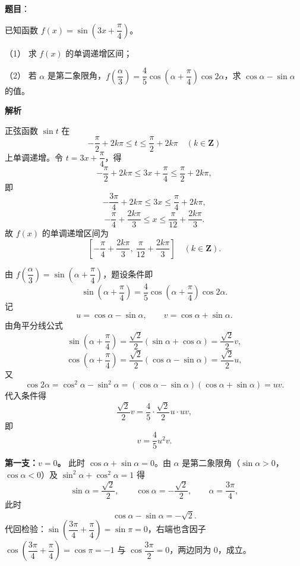 \begin{answer}

\textbf{题目}：

已知函数 $f(x)=\sin\left(3x+\dfrac\pi4\right)$。

（1） 求 $f(x)$ 的单调递增区间；

（2） 若 $\alpha$ 是第二象限角，$f\left(\dfrac\alpha3\right)=\dfrac45\cos\left(\alpha+\dfrac\pi4\right)\cos 2\alpha$，求 $\cos\alpha-\sin\alpha$ 的值。

\textbf{解析}


正弦函数 $\sin t$ 在
\nopagebreak[4]
\[-\frac\pi2+2k\pi\leqslant t\leqslant\frac\pi2+2k\pi\quad(k\in\mathbf Z)\]
上单调递增。令 $t=3x+\dfrac\pi4$，得
\nopagebreak[4]
\[-\frac\pi2+2k\pi\leqslant 3x+\frac\pi4\leqslant\frac\pi2+2k\pi,\]
即
\nopagebreak[4]
\[-\frac{3\pi}4+2k\pi\leqslant 3x\leqslant\frac\pi4+2k\pi,\]
\nopagebreak[4]
\[-\frac\pi4+\frac{2k\pi}3\leqslant x\leqslant\frac\pi{12}+\frac{2k\pi}3 .\]
故 $f(x)$ 的单调递增区间为
\nopagebreak[4]
\[\left[-\frac\pi4+\frac{2k\pi}3,\ \frac\pi{12}+\frac{2k\pi}3\right]\quad(k\in\mathbf Z).\]


由 $f\left(\dfrac\alpha3\right)=\sin\left(\alpha+\dfrac\pi4\right)$，题设条件即
\nopagebreak[4]
\[\sin\left(\alpha+\frac\pi4\right)=\frac45\cos\left(\alpha+\frac\pi4\right)\cos2\alpha .\]
记
\nopagebreak[4]
\[u=\cos\alpha-\sin\alpha,\qquad v=\cos\alpha+\sin\alpha .\]
由角平分线公式
\nopagebreak[4]
\[\sin\left(\alpha+\frac\pi4\right)=\frac{\sqrt2}2(\sin\alpha+\cos\alpha)=\frac{\sqrt2}2v,\]
\nopagebreak[4]
\[\cos\left(\alpha+\frac\pi4\right)=\frac{\sqrt2}2(\cos\alpha-\sin\alpha)=\frac{\sqrt2}2u,\]
又
\nopagebreak[4]
\[\cos2\alpha=\cos^2\alpha-\sin^2\alpha=(\cos\alpha-\sin\alpha)(\cos\alpha+\sin\alpha)=uv .\]
代入条件得
\nopagebreak[4]
\[\frac{\sqrt2}2v=\frac45\cdot\frac{\sqrt2}2u\cdot uv,\]
即
\nopagebreak[4]
\[v=\frac45u^2v .\]

\textbf{第一支：$v=0$。} 此时 $\cos\alpha+\sin\alpha=0$。由 $\alpha$ 是第二象限角（$\sin\alpha>0$，$\cos\alpha<0$）及 $\sin^2\alpha+\cos^2\alpha=1$ 得
\nopagebreak[4]
\[\sin\alpha=\frac{\sqrt2}2,\qquad \cos\alpha=-\frac{\sqrt2}2,\qquad \alpha=\frac{3\pi}4,\]
此时
\nopagebreak[4]
\[\cos\alpha-\sin\alpha=-\sqrt2 .\]
代回检验：$\sin\left(\dfrac{3\pi}4+\dfrac\pi4\right)=\sin\pi=0$，右端也含因子 $\cos\left(\dfrac{3\pi}4+\dfrac\pi4\right)=\cos\pi=-1$ 与 $\cos\dfrac{3\pi}2=0$，两边同为 $0$，成立。


\end{answer}
